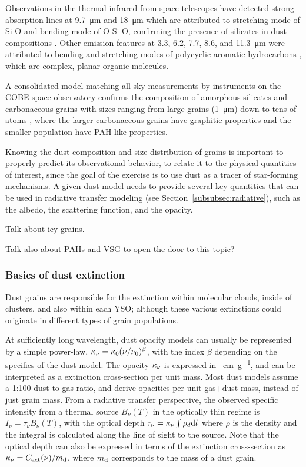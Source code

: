 Observations in the thermal infrared from space telescopes have detected strong absorption lines at \SI{9.7}{\micro\meter} and \SI{18}{\micro\meter} which are attributed to stretching mode of Si-O and bending mode of O-Si-O, confirming the presence of silicates in dust compositions \citep{Weingartner:2001du}. Other emission features at 3.3, 6.2, 7.7, 8.6, and \SI{11.3}{\micro\meter} \citep{Sellgren:1994vz} were attributed to bending and stretching modes of polycyclic aromatic hydrocarbons \citep[PAH, see][]{Gillett:1973bh,Allamandola:1985cf}, which are complex, planar organic molecules.
 
A consolidated model matching all-sky measurements by instruments on the COBE space observatory confirms the composition of amorphous silicates and carbonaceous grains with sizes ranging from large grains (\SI{1}{\micro\meter}) down to tens of atoms \citep{Li:2001gk}, where the larger carbonaceous grains have graphitic properties and the smaller population have PAH-like properties.






Knowing the dust composition and size distribution of grains is important to properly predict its observational behavior, to relate it to the physical quantities of interest, since the goal of the exercise is to use dust as a tracer of star-forming mechanisms. A given dust model needs to provide several key quantities that can be used in radiative transfer modeling (see Section~\ref{subsubsec:radiative}), such as the albedo, the scattering function, and the opacity.

Talk about icy grains.


Talk also about PAHs and VSG to open the door to this topic?
\subsubsection{Basics of dust extinction}

Dust grains are responsible for the extinction within molecular clouds, inside of clusters, and also within each YSO; although these various extinctions could originate in different types of grain populations.

At sufficiently long wavelength, dust opacity models can usually be represented by a simple power-law, $\kappa_\nu = \kappa_0(\nu/\nu_0)^\beta$, with the index $\beta$ depending on the specifics of the dust model. The opacity $\kappa_\nu$ is expressed in \si{\centi\meter\per\gram}, and can be interpreted as a extinction cross-section per unit mass. Most dust models assume a 1:100 dust-to-gas ratio, and derive opacities per unit {gas+dust} mass, instead of just grain mass. From a radiative transfer perspective, the observed specific intensity from a thermal source $B_\nu(T)$ in the optically thin regime is $I_\nu = \tau_\nu B_\nu(T)$, with the optical depth $\tau_\nu = \kappa_\nu\int{\rho_d\textrm{d}l}$ where $\rho$ is the density and the integral is calculated along the line of sight to the source. Note that the optical depth can also be expressed in terms of the extinction cross-section \Cext  as $\kappa_\nu = C_\textrm{ext}(\nu) / m_{\textrm{d}}$, where $m_{\textrm{d}}$ corresponds to the mass of a dust grain.

